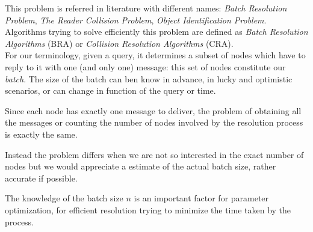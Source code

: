 \documentclass[12pt,a4paper,twocolumns]{report}
\begin{document}
This problem is referred in literature with different names: \emph{Batch Resolution Problem}, \emph{The Reader Collision Problem}, \emph{Object Identification Problem}.\\
Algorithms trying to solve efficiently this problem are defined as \emph{Batch Resolution Algorithms} (BRA) or  \emph{Collision Resolution Algorithms} (CRA).\\ 

For our terminology, given a query, it determines a subset of nodes which have to reply to it with one (and only one) message: this set of nodes constitute our \emph{batch}. The size of the batch can ben know in advance, in lucky and optimistic scenarios, or can change in function of the query or time.

Since each node has exactly one message to deliver, the problem of obtaining all the messages or counting the number of nodes involved by the resolution process is exactly the same.

Instead the problem differs when we are not so interested in the exact number of nodes but we would appreciate a estimate of the actual batch size, rather accurate if possible.

The knowledge of the batch size $n$ is an important factor for parameter optimization, for efficient resolution trying to minimize the time taken by the process.

\end{document}
